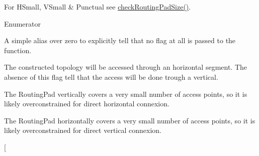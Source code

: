 For {\ttfamily H\-Small}, {\ttfamily V\-Small} \& {\ttfamily Punctual} see \hyperlink{group__LoadGlobalRouting_gaad5d32b07d1d53ecc8642e4b10df9605}{check\-Routing\-Pad\-Size()}. \begin{Desc}
\item[Enumerator]\par
\begin{description}
\item[{\em 
\hypertarget{group__LoadGlobalRouting_ggaec07c7f30c801c3b0f72193757250d64add44bf8d6f7bbe1393d76b940b85294b}{No\-Flags}\label{group__LoadGlobalRouting_ggaec07c7f30c801c3b0f72193757250d64add44bf8d6f7bbe1393d76b940b85294b}
}]A simple alias over zero to explicitly tell that no flag at all is passed to the function. \item[{\em 
\hypertarget{group__LoadGlobalRouting_ggaec07c7f30c801c3b0f72193757250d64a5c3692a6c886c6293a3c9f240b60a5d9}{H\-Access}\label{group__LoadGlobalRouting_ggaec07c7f30c801c3b0f72193757250d64a5c3692a6c886c6293a3c9f240b60a5d9}
}]The constructed topology will be accessed through an horizontal segment. The absence of this flag tell that the access will be done trough a vertical. \item[{\em 
\hypertarget{group__LoadGlobalRouting_ggaec07c7f30c801c3b0f72193757250d64a260f6bf57246879aed7febfe83c9dacc}{V\-Small}\label{group__LoadGlobalRouting_ggaec07c7f30c801c3b0f72193757250d64a260f6bf57246879aed7febfe83c9dacc}
}]The Routing\-Pad vertically covers a very small number of access points, so it is likely overconstrained for direct horizontal connexion. \item[{\em 
\hypertarget{group__LoadGlobalRouting_ggaec07c7f30c801c3b0f72193757250d64af1a4f1cb841460f20d26dcf902247fb8}{H\-Small}\label{group__LoadGlobalRouting_ggaec07c7f30c801c3b0f72193757250d64af1a4f1cb841460f20d26dcf902247fb8}
}]The Routing\-Pad horizontally covers a very small number of access points, so it is likely overconstrained for direct vertical connexion. \item[{\em 
}
\end{description}
\end{Desc}
